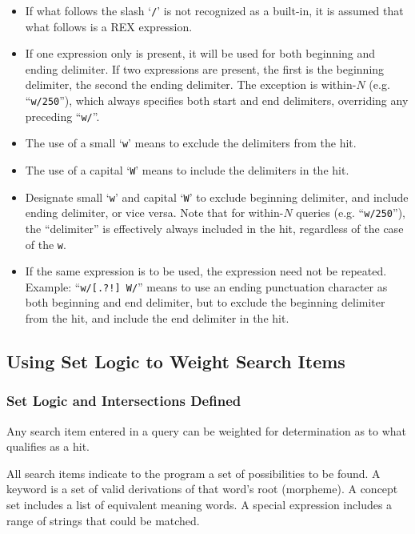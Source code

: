 \begin{itemize}
\item If what follows the slash `\verb`/`' is not recognized as a
built-in, it is assumed that what follows is a REX expression.

\item If one expression only is present, it will be used for both
beginning and ending delimiter.  If two expressions are present, the
first is the beginning delimiter, the second the ending delimiter.
The exception is within-$N$ (e.g. ``\verb`w/250`''), which always
specifies both start and end delimiters, overriding any preceding
``\verb`w/`''.

\item The use of a small `\verb`w`' means to exclude the delimiters
from the hit.

\item The use of a capital `\verb`W`' means to include the delimiters
in the hit.

\item Designate small `\verb`w`' and capital `\verb`W`' to exclude
beginning delimiter, and include ending delimiter, or vice versa.
Note that for within-$N$ queries (e.g. ``\verb`w/250`''), the
``delimiter'' is effectively always included in the hit, regardless
of the case of the \verb`w`.

\item If the same expression is to be used, the expression need not be
repeated.  Example:  ``\verb`w/[.?!] W/`'' means to use an ending
punctuation character as both beginning and end delimiter, but to
exclude the beginning delimiter from the hit, and include the end
delimiter in the hit.
\end{itemize}

\subsection{Using Set Logic to Weight Search Items}

\subsubsection{Set Logic and Intersections Defined}

Any search item entered in a query can be weighted for determination
as to what qualifies as a hit.

All search items indicate to the program a set of possibilities to be
found.  A keyword is a set of valid derivations of that word's root
(morpheme).  A concept set includes a list of equivalent meaning
words.  A special expression includes a range of strings that could be
matched.

